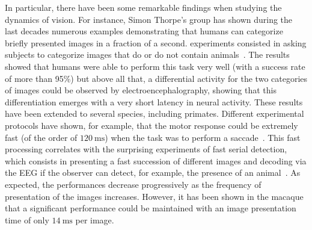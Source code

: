 \documentclass[brainsci, %
               review,accept,pdftex,moreauthors
               ]{Definitions/mdpi}
\newcommand{\ms}{\si{\milli\second}}%
\begin{document}
In particular, there have been some remarkable findings when studying the dynamics of vision. For instance, Simon Thorpe's group has shown during the last decades numerous examples demonstrating that humans can categorize briefly presented images in a fraction of a second.  experiments consisted in asking subjects to categorize images that do or do not contain animals~\citep{thorpe_speed_1996}. The results showed that humans were able to perform this task very well (with a success rate of more than 95\%) but above all that, a differential activity for the two categories of images could be observed by electroencephalography, showing that this differentiation emerges with a very short latency in neural activity. These results have been extended to several species, including primates. Different experimental protocols have shown, for example, that the motor response could be extremely fast (of the order of $120~\ms$) when the task was to perform a saccade~\citep{kirchner_ultra-rapid_2006}. This fast processing correlates with the surprising experiments of fast serial detection, which consists in presenting a fast succession of different images and decoding via the EEG if the observer can detect, for example, the presence of an animal~\citep{keysers_speed_2001}. As expected, the performances decrease progressively as the frequency of presentation of the images increases. However, it has been shown in the macaque that a significant performance could be maintained with an image presentation time of only $14~\ms$ per image.
\end{document}
